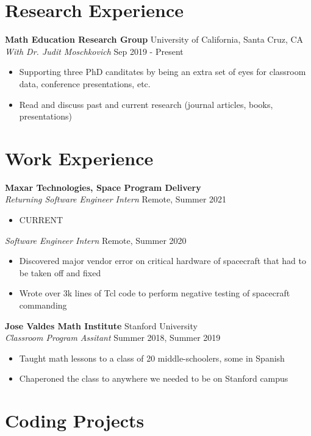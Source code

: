 \documentclass[10pt,letterpaper]{article}
\begin{document}
\section*{Research Experience} \hrulefill

\textbf{Math Education Research Group} \hfill University of California, Santa Cruz, CA\\
\textit{With Dr. Judit Moschkovich} \hfill Sep 2019 - Present
\begin{itemize}
    \item Supporting three PhD canditates by being an extra set of eyes for classroom data, conference presentations, etc.
    \item Read and discuss past and current research (journal articles, books, presentations)
\end{itemize}


\section*{Work Experience} \hrulefill 

\textbf{Maxar Technologies, Space Program Delivery}\\
\textit{Returning Software Engineer Intern} \hfill Remote, Summer 2021
\begin{itemize}
    \item CURRENT 
\end{itemize}
\textit{Software Engineer Intern} \hfill Remote, Summer 2020
\begin{itemize}
    \item Discovered major vendor error on critical hardware of spacecraft that had to be taken off and fixed
    \item Wrote over 3k lines of Tcl code to perform negative testing of spacecraft commanding
\end{itemize}

\textbf{Jose Valdes Math Institute} \hfill Stanford University\\
\textit{Classroom Program Assitant} \hfill Summer 2018, Summer 2019
\begin{itemize}
    \item Taught math lessons to a class of 20 middle-schoolers, some in Spanish
    \item Chaperoned the class to anywhere we needed to be on Stanford campus
\end{itemize}


\section*{Coding Projects} \hrulefill 
\end{document}
